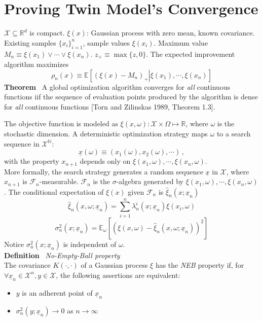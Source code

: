 \documentclass[a4paper,onecolumn]{article}
\begin{document}
\section{Proving Twin Model's Convergence}
$\mathcal{X}\subseteq \mathbb{R}^d$ is compact. $\xi(x)$: Gaussian process with zero mean, known covariance.
Existing samples $\{x_i\}_{i=1}^n$, sample values $\xi(x_i)$. Maximum value $M_n\equiv \xi(x_1) \vee \cdots \vee \xi(x_n)$.
$z_+ \equiv \max\{z,0\}$. The expected improvement algorithm maximizes
$$
    \rho_n(x) \equiv \mathbb{E}\left[\left.\left(\xi(x) - M_n\right)_+\right|\xi(x_1),\cdots, \xi(x_n)\right]
$$
\textbf{Theorem} $\,$ A global optimization algorithm converges for \emph{all} continuous functions iif the sequence of evaluation points
produced by the algorithm is dense for \emph{all} continuous functions [Torn and Zilinskas 1989, Theorem 1.3]. 

\noindent The objective function is modeled as $\xi(x,\omega): \mathcal{X}\times\Omega\mapsto \mathbb{R}$, where $\omega$ is the stochastic dimension. A deterministic 
optimization strategy maps $\omega$ to a search sequence in $\mathcal{X}^\mathbb{N}$:
$$
    \underline{x}(\omega) \equiv \left( x_1(\omega), x_2(\omega), \cdots \right)\,,
$$
with the property $x_{n+1}$ depends only on $\xi(x_1,\omega),\cdots, \xi(x_{n}, \omega)$.\\
More formally, the search strategy generates a random sequence $\underline{x}$ in $\mathcal{X}$, where
$x_{n+1}$ is $\mathcal{F}_n$-measurable. $\mathcal{F}_n$ is the $\sigma$-algebra generated by $\xi(x_1,\omega),\cdots, \xi(x_{n}, \omega)$.
The conditional expectation of $\xi(x)$ given $\mathcal{F}_n$ is $\hat{\xi}_n (x; \underline{x}_n)$
$$
    \hat{\xi}_n (x,\omega; \underline{x}_n) = \sum_{i=1}^n \lambda_n^i(x; \underline{x}_n) \xi(x_i, \omega)
$$
$$
    \sigma_n^2(x;\underline{x}_n) = \mathbb{E}_\omega\left[ \left(\xi(x,\omega) - \hat{\xi}_n (x,\omega; \underline{x}_n)\right)^2 \right]
$$
Notice $\sigma_n^2(x;\underline{x}_n)$ is independent of $\omega$.\\

\noindent \textbf{Definition} $\,$ \emph{No-Empty-Ball property}\\
The covariance $K(\cdot, \cdot)$ of a Gaussian process $\xi$ has the \emph{NEB} property if, for $\forall \underline{x}_n \in \mathcal{X}^n, y \in \mathcal{X}$, 
the following assertions are equivalent:\\
\begin{itemize}
    \item $y$ is an adherent point of $\underline{x}_n$
    \item $\sigma_n^2(y; \underline{x}_n) \rightarrow 0$ as $n\rightarrow \infty$
\end{itemize}
\end{document}
